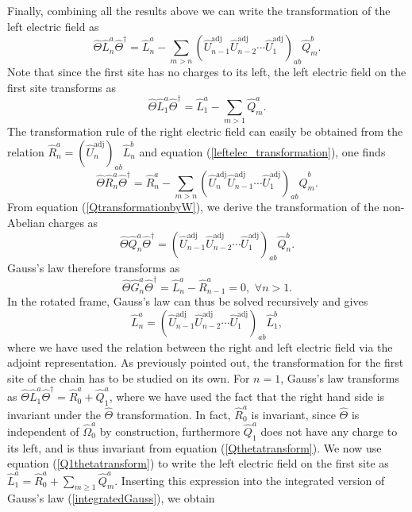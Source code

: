 \documentclass[twocolumn,aps,showpacs,prb,superscriptaddress,floatfix,10pt,nofootinbib]{revtex4-2}
\begin{document}
Finally, combining all the results above we can write the transformation of the left electric field as
\begin{equation}
\hat{\Theta}\hat{L}_{n}^{a}\hat{\Theta}^{\dagger}=\hat{L}_{n}^{a}-\sum_{m>n} \left( \hat{U}_{n-1}^{\text{adj}}\hat{U}_{n-2}^{\text{adj}}\cdots \hat{U}_{1}^{\text{adj}}\right)_{ab}\hat{Q}_{m}^{b}. \label{leftelec_transformation}
\end{equation}
Note that since the first site has no charges to its left, the left electric field on the first site transforms as
\begin{equation}
\hat{\Theta} \hat{L}_{1}^{a} \hat{\Theta}^{\dagger}=\hat{L}_{1}^{a}-\sum_{m>1}\hat{Q}_{m}^{a}. \label{Q1thetatransform}
\end{equation}
The transformation rule of the right electric field can easily be obtained from the relation $\hat{R}_{n}^{a}=(\hat{U}_{n}^{\text{adj}})_{ab}\hat{L}_{n}^{b}$ and equation (\ref{leftelec_transformation}), one finds 
\begin{equation}
\hat{\Theta}\hat{R}_{n}^{a}\hat{\Theta}^{\dagger}=\hat{R}_{n}^{a}-\sum_{m>n} \left( \hat{U}_{n}^{\text{adj}}\hat{U}_{n-1}^{\text{adj}}\cdots \hat{U}_{1}^{\text{adj}}\right)_{ab}\hat{Q}_{m}^{b}. \label{rightelec_transformation}
\end{equation}
From equation (\ref{QtransformationbyW}), we derive the transformation of the non-Abelian charges as
\begin{equation}
\hat{\Theta}\hat{Q}_{n}^{a}\hat{\Theta}^{\dagger}=\left( \hat{U}_{n-1}^{\text{adj}}\hat{U}_{n-2}^{\text{adj}}\cdots \hat{U}_{1}^{\text{adj}}\right)_{ab}\hat{Q}_{n}^{b} .
\label{Qthetatransform}
\end{equation}
Gauss's law therefore transforms as
\begin{equation}
\hat{\Theta} \hat{G}_{n}^{a}\hat{\Theta}^{\dagger}=\hat{L}_{n}^{a}-\hat{R}_{n-1}^{a}=0, \, \, \forall n>1. 
\end{equation}
In the rotated frame, Gauss's law can thus be solved recursively and gives 
\begin{equation}
\hat{L}_{n}^{a}=(\hat{U}_{n-1}^{\mathrm{adj}}\hat{U}_{n-2}^{\mathrm{adj}}\cdots \hat{U}_{1}^{\mathrm{adj}})_{ab} \hat{L}_{1}^{b}, \label{integratedGauss}
\end{equation}
where we have used the relation between the right and left electric field via the adjoint representation. As previously pointed out, the transformation for the first site of the chain has to be studied on its own. For $n=1$, Gauss's law transforms as $\hat{\Theta} \hat{L}_{1}^{a} \hat{\Theta}^{\dagger}=\hat{R}_{0}^{a}+\hat{Q}_{1}^{a}$, where we have used the fact that the right hand side is invariant under the $\hat{\Theta}$ transformation. In fact, $\hat{R}_{0}^{a}$ is invariant, since $\hat{\Theta}$ is independent of $\hat{\Omega}_{0}^{a}$ by construction, furthermore $\hat{Q}_{1}^{a}$ does not have any charge to its left, and is thus invariant from equation (\ref{Qthetatransform}).  We now use equation (\ref{Q1thetatransform}) to write the left electric field on the first site as $\hat{L}_{1}^{a}=\hat{R}_{0}^{a}+\sum_{m\geq 1}\hat{Q}_{m}^{a}$. Inserting this expression into the integrated version of Gauss's law (\ref{integratedGauss}), we obtain 
\end{document}
